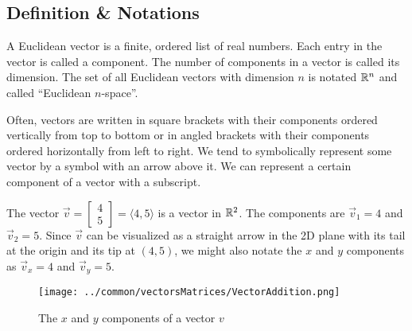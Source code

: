 \subsection{Definition \& Notations}
\begin{definition}
	A Euclidean vector is a finite, ordered list of real numbers.
	Each entry in the vector is called a component.
	The number of components in a vector is called its dimension.
	The set of all Euclidean vectors with dimension $n$ is notated $\mathbb{R}^n$ and called ``Euclidean $n$-space''.
\end{definition}

Often, vectors are written in square brackets with their components ordered vertically from top to bottom or in angled brackets with their components ordered horizontally from left to right.
We tend to symbolically represent some vector by a symbol with an arrow above it.
We can represent a certain component of a vector with a subscript.

\begin{example}
	The vector $\vec{v} = \begin{bmatrix}4 \\ 5\end{bmatrix} = \langle 4, 5 \rangle$ is a vector in $\mathbb{R}^2$.
	The components are $\vec{v}_1 = 4$ and $\vec{v}_2 = 5$.
	Since $\vec{v}$ can be visualized as a straight arrow in the 2D plane with its tail at the origin and its tip at $(4,5)$, we might also notate the $x$ and $y$ components as $\vec{v}_x = 4$ and $\vec{v}_y = 5$.
	
	\begin{figure}[H]
		\centering
		\texttt{[image: ../common/vectorsMatrices/VectorAddition.png]}
		\caption{The $x$ and $y$ components of a vector $v$}
	\end{figure}
\end{example}